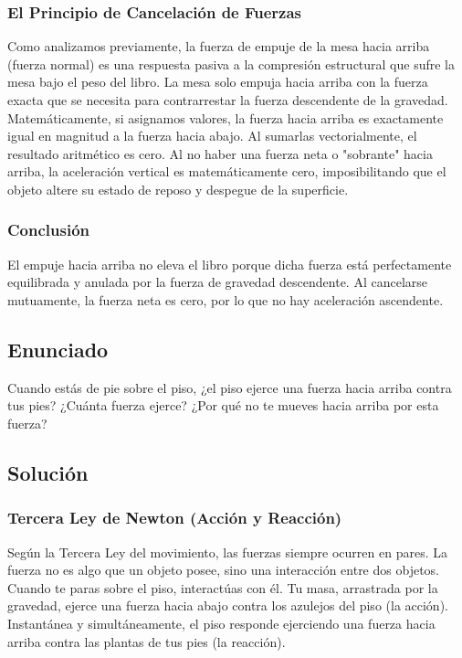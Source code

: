 \documentclass[12pt,letterpaper]{article}
\begin{document}
\subsubsection*{El Principio de Cancelación de Fuerzas}
Como analizamos previamente, la fuerza de empuje de la mesa hacia arriba (fuerza normal) es una respuesta pasiva a la compresión estructural que sufre la mesa bajo el peso del libro. La mesa solo empuja hacia arriba con la fuerza exacta que se necesita para contrarrestar la fuerza descendente de la gravedad. 
Matemáticamente, si asignamos valores, la fuerza hacia arriba es exactamente igual en magnitud a la fuerza hacia abajo. Al sumarlas vectorialmente, el resultado aritmético es cero. 
Al no haber una fuerza neta o "sobrante" hacia arriba, la aceleración vertical es matemáticamente cero, imposibilitando que el objeto altere su estado de reposo y despegue de la superficie.

\subsubsection*{Conclusión}
El empuje hacia arriba no eleva el libro porque dicha fuerza está perfectamente equilibrada y anulada por la fuerza de gravedad descendente. Al cancelarse mutuamente, la fuerza neta es cero, por lo que no hay aceleración ascendente.

\newpage

\subsection*{Enunciado}
Cuando estás de pie sobre el piso, ¿el piso ejerce una fuerza hacia arriba contra tus pies? ¿Cuánta fuerza ejerce? ¿Por qué no te mueves hacia arriba por esta fuerza?

\subsection*{Solución}

\subsubsection*{Tercera Ley de Newton (Acción y Reacción)}
Según la Tercera Ley del movimiento, las fuerzas siempre ocurren en pares. La fuerza no es algo que un objeto posee, sino una interacción entre dos objetos. Cuando te paras sobre el piso, interactúas con él. Tu masa, arrastrada por la gravedad, ejerce una fuerza hacia abajo contra los azulejos del piso (la acción). Instantánea y simultáneamente, el piso responde ejerciendo una fuerza hacia arriba contra las plantas de tus pies (la reacción).
\end{document}
